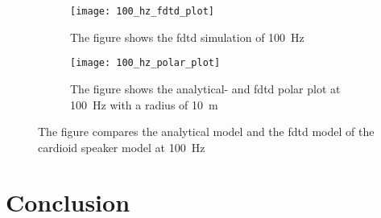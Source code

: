 \begin{figure}[H]
\centering
\begin{subfigure}[htbp]{0.55\textwidth}
		\texttt{[image: 100\_hz\_fdtd\_plot]}
		\caption{The figure shows the \gls{fdtd} simulation of \SI{100}{\hertz}}
		\label{fig:fdtd_100_Hz}
\end{subfigure}
\begin{subfigure}[htbp]{0.35\textwidth}
		\texttt{[image: 100\_hz\_polar\_plot]}
		\caption{The figure shows the analytical- and \gls{fdtd} polar plot at \SI{100}{\hertz} with a radius of \SI{10}{\meter}}
		\label{fig:polar_100_Hz}
\end{subfigure} 
\caption{The figure compares the analytical model and the \gls{fdtd} model of the cardioid speaker model at \SI{100}{\hertz}}
\end{figure}

\section{Conclusion}